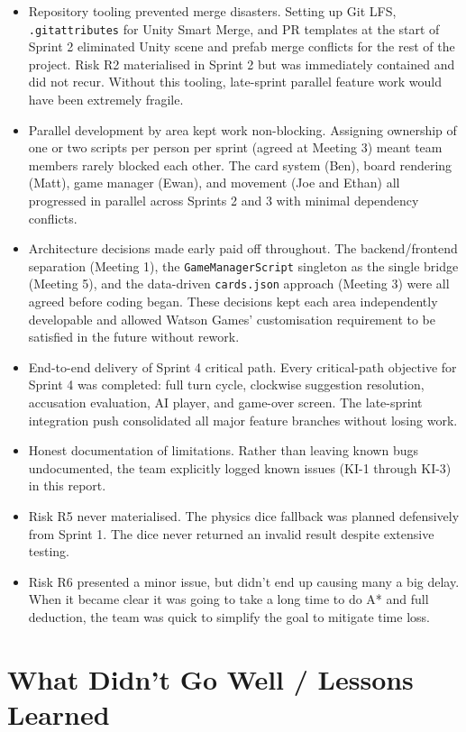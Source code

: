 \begin{itemize}
    \item Repository tooling prevented merge disasters. Setting up Git LFS, \texttt{.gitattributes} for Unity Smart Merge, and PR templates at the start of Sprint 2 eliminated Unity scene and prefab merge conflicts for the rest of the project. Risk R2 materialised in Sprint 2 but was immediately contained and did not recur. Without this tooling, late-sprint parallel feature work would have been extremely fragile.
    \item Parallel development by area kept work non-blocking. Assigning ownership of one or two scripts per person per sprint (agreed at Meeting 3) meant team members rarely blocked each other. The card system (Ben), board rendering (Matt), game manager (Ewan), and movement (Joe and Ethan) all progressed in parallel across Sprints 2 and 3 with minimal dependency conflicts.
    \item Architecture decisions made early paid off throughout. The backend/frontend separation (Meeting 1), the \texttt{GameManagerScript} singleton as the single bridge (Meeting 5), and the data-driven \texttt{cards.json} approach (Meeting 3) were all agreed before coding began. These decisions kept each area independently developable and allowed Watson Games' customisation requirement to be satisfied in the future without rework.
    \item End-to-end delivery of Sprint 4 critical path. Every critical-path objective for Sprint 4 was completed: full turn cycle, clockwise suggestion resolution, accusation evaluation, AI player, and game-over screen. The late-sprint integration push consolidated all major feature branches without losing work.
    \item Honest documentation of limitations. Rather than leaving known bugs undocumented, the team explicitly logged known issues (KI-1 through KI-3) in this report.
    \item Risk R5 never materialised. The physics dice fallback was planned defensively from Sprint 1. The dice never returned an invalid result despite extensive testing.
    \item Risk R6 presented a minor issue, but didn't end up causing many a big delay. When it became clear it was going to take a long time to do A* and full deduction, the team was quick to simplify the goal to mitigate time loss.
\end{itemize}

\section{What Didn't Go Well / Lessons Learned}

